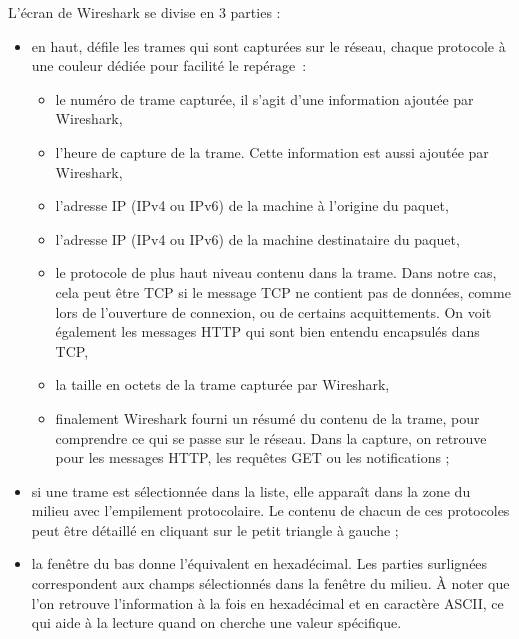 L'écran de Wireshark se divise en 3 parties :
\begin{itemize}
\item en haut, défile les trames qui sont capturées sur le réseau, chaque protocole à une couleur dédiée pour facilité le repérage~:
\begin{itemize}
\item le numéro de trame capturée, il s'agit d'une information ajoutée par Wireshark,
\item l'heure de capture de la trame. Cette information est aussi ajoutée par Wireshark,
\item l'adresse IP (IPv4 ou IPv6) de la machine à l'origine du paquet, 
\item l'adresse IP (IPv4 ou IPv6) de la machine destinataire du paquet,
\item le protocole de plus haut niveau contenu dans la trame. Dans notre cas, cela peut être TCP si le message TCP ne contient pas de données, comme lors de l'ouverture de connexion, ou de certains acquittements. On voit également les messages \ac{HTTP} qui sont bien entendu encapsulés dans TCP,
\item la taille en octets de la trame capturée par Wireshark,
\item finalement Wireshark fourni un résumé du contenu de la trame, pour comprendre ce qui se passe sur le réseau. Dans la capture, on retrouve pour les messages \ac{HTTP}, les requêtes GET ou les notifications ;
\end{itemize}
\item si une trame est sélectionnée dans la liste, elle apparaît dans la zone du milieu avec l'empilement protocolaire. Le contenu de chacun de ces protocoles peut être détaillé en cliquant sur le petit triangle à gauche ;
\item la fenêtre du bas donne l'équivalent en hexadécimal. Les parties surlignées correspondent aux champs sélectionnés dans la fenêtre du milieu. À noter que l'on retrouve l'information à la fois en hexadécimal et en caractère \ac{ASCII}, ce qui aide à la lecture quand on cherche une valeur spécifique.
\end{itemize}

